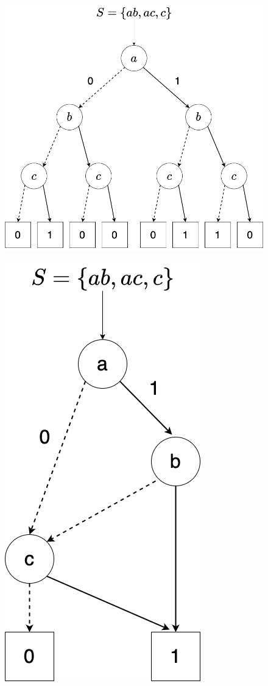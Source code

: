 \begin{figure}[htbp]
  \begin{minipage}[b]{0.48\hsize}
    \centering
    \includegraphics[scale=0.25]{img/binary_graph.png}
    \label{binary_graph}
  \end{minipage}
  \begin{minipage}[b]{0.48\hsize}
    \centering
    \includegraphics[scale=0.25]{img/zdd.png}

\end{minipage}
\end{figure}
